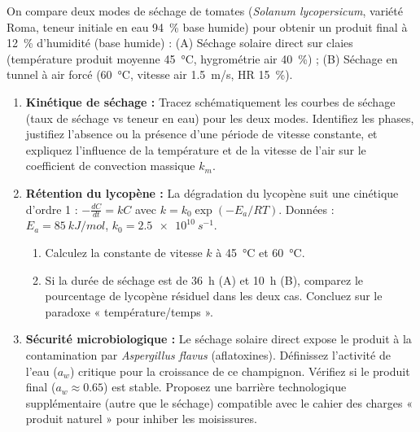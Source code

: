 \documentclass[11pt]{article}
\begin{document}
\begin{exercice}
On compare deux modes de séchage de tomates (\textit{Solanum lycopersicum}, variété Roma, teneur initiale en eau \SI{94}{\%} base humide) pour obtenir un produit final à \SI{12}{\%} d'humidité (base humide) : (A) Séchage solaire direct sur claies (température produit moyenne \SI{45}{\celsius}, hygrométrie air \SI{40}{\%}) ; (B) Séchage en tunnel à air forcé (\SI{60}{\celsius}, vitesse air \SI{1.5}{m/s}, HR \SI{15}{\%}).

\begin{enumerate}
    \item \textbf{Kinétique de séchage :} Tracez schématiquement les courbes de séchage (taux de séchage vs teneur en eau) pour les deux modes. Identifiez les phases, justifiez l'absence ou la présence d'une période de vitesse constante, et expliquez l'influence de la température et de la vitesse de l'air sur le coefficient de convection massique $k_m$.
    \item \textbf{Rétention du lycopène :} La dégradation du lycopène suit une cinétique d'ordre 1 : $-\frac{dC}{dt} = k C$ avec $k = k_0 \exp(-E_a/RT)$. Données : $E_a = \SI{85}{kJ/mol}$, $k_0 = \SI{2.5e10}{s^{-1}}$. 
    \begin{enumerate}
        \item Calculez la constante de vitesse $k$ à \SI{45}{\celsius} et \SI{60}{\celsius}.
        \item Si la durée de séchage est de \SI{36}{h} (A) et \SI{10}{h} (B), comparez le pourcentage de lycopène résiduel dans les deux cas. Concluez sur le paradoxe « température/temps ».
    \end{enumerate}
    \item \textbf{Sécurité microbiologique :} Le séchage solaire direct expose le produit à la contamination par \textit{Aspergillus flavus} (aflatoxines). Définissez l'activité de l'eau ($a_w$) critique pour la croissance de ce champignon. Vérifiez si le produit final ($a_w \approx 0.65$) est stable. Proposez une barrière technologique supplémentaire (autre que le séchage) compatible avec le cahier des charges « produit naturel » pour inhiber les moisissures.
\end{enumerate}
\end{exercice}
\end{document}

